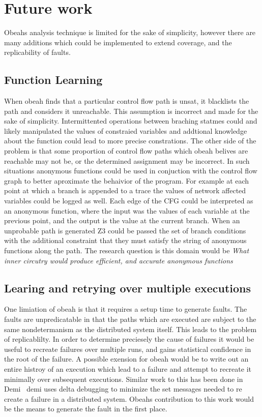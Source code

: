 \section{Future work}
\label{sec:future}

Obeahs analysis technique is limited for the sake of simplicity, however there
are many additions which could be implemented to extend coverage, and the
replicability of faults.

\subsection{Function Learning}

When obeah finds that a particular control flow path is unsat, it blacklists
the path and considers it unreachable. This assumption is incorrect and made
for the sake of simplicity. Intermittented operations between braching statmes
could and likely manipulated the values of constraied variables and addtional
knowledge about the function could lead to more precise constrations. The other
side of the problem is that some proportion of control flow paths which obeah
belives are reachable may not be, or the determined assignment may be
incorrect. In such situations anonymous functions could be used in conjuction
with the control flow graph to better aproximate the behaivior of the program.
For example at each point at which a branch is appended to a trace the values
of network affected variables could be logged as well. Each edge of the CFG
could be interpreted as an anonymous function, where the input was the values
of each variable at the previous point, and the output is the value at the
current branch. When an unprobable path is generated Z3 could be passed the set
of branch conditions with the additional constraint that they must satisfy the
string of anonymous functions along the path. The research question is this
domain would be \emph{What inner circutry would produce efficient, and accurate
anonymous functions}

\subsection{Learing and retrying over multiple executions}

One limiation of obeah is that it requires a setup time to generate faults. The
faults are unpredicatable in that the paths which are executed are subject to
the same nondetermanism as the distributed system itself. This leads to the
problem of replicablilty. In order to determine preciesely the cause of
failures it would be useful to recreate failures over multiple runs, and gains
statistical confidence in the root of the failure. A possible exension for
obeah would be to write out an entire histroy of an execution which lead to a
failure and attempt to recreate it minimally over subsequent executions.
Similar work to this has been done in Demi~\cite{} demi uses delta debugging to
minimize the set messages needed to re create a failure in a distributed
system. Obeahs contribution to this work would be the means to generate the
fault in the first place.

